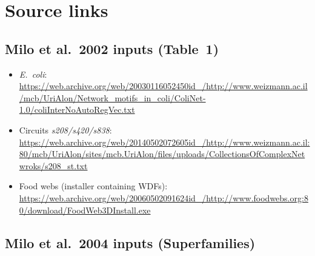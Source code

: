 \documentclass[11pt]{article}
\begin{document}
\section{Source links}

\subsection{Milo et al.\ 2002 inputs (Table~1)}

\begin{itemize}
  \item \textit{E.\ coli}: \url{https://web.archive.org/web/20030116052450id_/http://www.weizmann.ac.il/mcb/UriAlon/Network_motifs_in_coli/ColiNet-1.0/coliInterNoAutoRegVec.txt}
  \item Circuits \textit{s208/s420/s838}: \url{https://web.archive.org/web/20140502072605id_/http://www.weizmann.ac.il:80/mcb/UriAlon/sites/mcb.UriAlon/files/uploads/CollectionsOfComplexNetwroks/s208_st.txt}
  \item Food webs (installer containing WDFs): \url{https://web.archive.org/web/20060502091624id_/http://www.foodwebs.org:80/download/FoodWeb3DInstall.exe}
\end{itemize}

\subsection{Milo et al.\ 2004 inputs (Superfamilies)}
\end{document}
